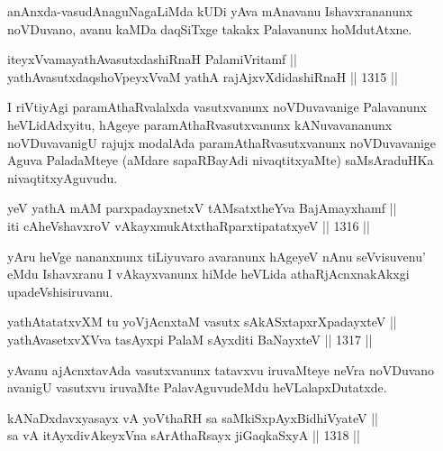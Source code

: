 \begin{artha}
anAnxda-vasudAnaguNagaLiMda kUDi yAva mAnavanu Ishavxrananunx noVDuvano, avanu kaMDa daqSiTxge takakx Palavanunx hoMdutAtxne.
\end{artha}

\begin{shl}
iteyxVvamayathAvasutxdashiRnaH PalamiVritamf || \\
yathAvasutxdaqshoV\s peyxVvaM yathA rajAjxvXdidashiRnaH ||  1315 ||  
\end{shl}

\begin{artha}
I riVtiyAgi paramAthaRvalalxda vasutxvanunx noVDuvavanige Palavanunx heVLidAdxyitu, hAgeye paramAthaRvasutxvanunx kANuvavananunx noVDuvavanigU rajujx modalAda paramAthaRvasutxvanunx noVDuvavanige Aguva PaladaMteye (aMdare sapaRBayAdi nivaqtitxyaMte) saMsAraduHKa nivaqtitxyAguvudu.
\end{artha}


\begin{shl}
yeV yathA mAM parxpadayxnetxV tAMsatxtheYva BajAmayxhamf ||  \\
iti cA\s \s heVshavxroV vAkayxmukAtxthaRparxtipatatxyeV ||  1316 ||  
\end{shl}

\begin{artha}
yAru heVge  nananxnunx tiLiyuvaro avaranunx hAgeyeV nAnu seVvisuvenu' eMdu Ishavxranu I vAkayxvanunx hiMde heVLida athaRjAcnxnakAkxgi upadeVshisiruvanu.
\end{artha}

\begin{shl}
yathAtatatxvXM tu yoV\s jAcnxtaM vasutx sAkASxtapxrXpadayxteV ||  \\
yathAvasetxvXVva tasAyxpi PalaM  sAyxditi BaNayxteV ||  1317 ||  
\end{shl}

\begin{artha}
yAvanu ajAcnxtavAda vasutxvanunx tatavxvu iruvaMteye neVra noVDuvano avanigU vasutxvu iruvaMte PalavAguvudeMdu heVLalapxDutatxde.
\end{artha}


\begin{shl}
kANaDxdavxyasayx vA yoV\s thaRH sa saMkiSxpAyxBidhiVyateV || \\
sa vA itAyxdivAkeyxVna sArAthaRsayx jiGaqkaSxyA ||  1318 ||  
\end{shl}

